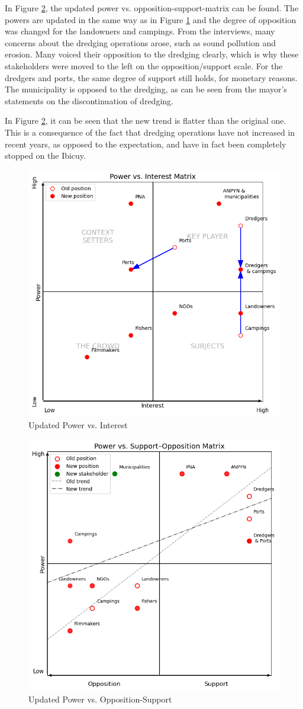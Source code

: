 In Figure \ref{fig:power-supportNEW}, the updated power vs. opposition-support-matrix can be found. The powers are updated in the same way as in Figure \ref{fig:power-interestNEW} and the degree of opposition was changed for the landowners and campings. From the interviews, many concerns about the dredging operations arose, such as sound pollution and erosion. Many voiced their opposition to the dredging clearly, which is why these stakeholders were moved to the left on the opposition/support scale. For the dredgers and ports, the same degree of support still holds, for monetary reasons. The municipality is opposed to the dredging, as can be seen from the mayor's statements on the discontinuation of dredging.


In Figure \ref{fig:power-supportNEW}, it can be seen that the new trend is flatter than the original one. This is a consequence of the fact that dredging operations have not increased in recent years, as opposed to the expectation, and have in fact been completely stopped on the Ibicuy.


\begin{figure}[H]
    \centering
    \includegraphics[width=0.65\linewidth]{figures/ch3/NewPowerVSInterest.png}
    \caption{Updated Power vs. Interest}
    \label{fig:power-interestNEW}
\end{figure}



\begin{figure}[H]
    \centering
    \includegraphics[width=0.65\linewidth]{figures/ch3/NewPowerVSSupport.png}
    \caption{Updated Power vs. Opposition-Support}
    \label{fig:power-supportNEW}
\end{figure}